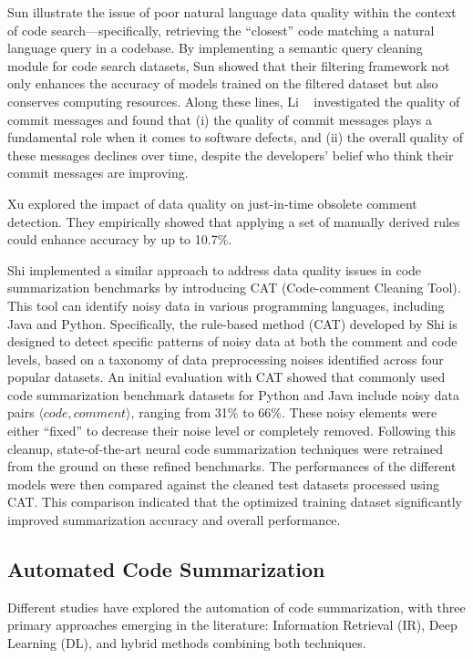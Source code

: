 Sun \etal \cite{sun2022importance} illustrate the issue of poor natural language data quality within the context of code search—specifically, retrieving the ``closest'' code matching a natural language query in a codebase. By implementing a semantic query cleaning module for code search datasets, Sun \etal showed that their filtering framework not only enhances the accuracy of models trained on the filtered dataset but also conserves computing resources. Along these lines, Li \etal~\cite{li2023commit} investigated the quality of commit messages and found that (i) the quality of commit messages plays a fundamental role when it comes to software defects, and (ii) the overall quality of these messages declines over time, despite the developers' belief who think their commit messages are improving.

Xu \etal \cite{xu2023data} explored the impact of data quality on just-in-time obsolete comment detection.
They empirically showed that applying a set of manually derived rules could enhance accuracy by up to 10.7\%.

Shi \etal \cite{shi2022we} implemented a similar approach to address data quality issues in code summarization benchmarks by introducing CAT (Code-comment Cleaning Tool). This tool can identify noisy data in various programming languages, including Java and Python. Specifically, the rule-based method (\ie CAT) developed by Shi \etal is designed to detect specific patterns of noisy data at both the comment and code levels, based on a taxonomy of data preprocessing noises identified across four popular datasets. An initial evaluation with CAT showed that commonly used code summarization benchmark datasets for Python and Java include noisy data pairs $\langle code, comment \rangle$, ranging from 31\% to 66\%. These noisy elements were either ``fixed'' to decrease their noise level or completely removed. Following this cleanup, state-of-the-art neural code summarization techniques were retrained from the ground on these refined benchmarks. The performances of the different models were then compared against the cleaned test datasets processed using CAT. This comparison indicated that the optimized training dataset significantly improved summarization accuracy and overall performance.

\subsection{Automated Code Summarization}
Different studies have explored the automation of code summarization, with three primary approaches emerging in the literature: Information Retrieval (IR), Deep Learning (DL), and hybrid methods combining both techniques.

